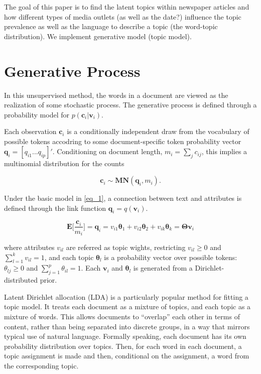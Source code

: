 \documentclass[12pt,a4paper,notitlepage]{article}
\begin{document}
The goal of this paper is to find the latent topics within newspaper articles and how different types of media outlets (as well as the date?) influence the topic prevalence as well as the language to describe a topic (the word-topic distribution). We implement generative model (topic model). 

\section{Generative Process}

In this unsupervised method, the words in a document are viewed as the realization of some stochastic process. The generative process is defined through a probability model for $p(\boldsymbol{c}_i|\boldsymbol{v}_i)$.

Each observation $\boldsymbol{c}_i$ is a conditionally independent draw from the vocabulary of possible tokens accodring to some document-specific token probability vector $\boldsymbol{q}_i=[q_{i1}...q_{ip}]'$. Conditioning on document length, $m_i=\sum_jc_{ij}$, this implies a multinomial distribution for the counts

\begin{equation}\label{eq_1}
	\boldsymbol{c}_i \sim \boldsymbol{MN}(\boldsymbol{q}_i,m_i). 
\end{equation}

Under the basic model in \ref{eq_1}, a connection between text and attributes is defined through the link function $\boldsymbol{q}_i=q(\boldsymbol{v}_i)$. 

\begin{equation}\label{eq_2}
	\boldsymbol{E} \bigg[\frac{\boldsymbol{c}_i}{m_i}\bigg]=\boldsymbol{q}_i =v_{i1}\boldsymbol{\theta}_1+v_{i2}\boldsymbol{\theta}_2+v_{ik}\boldsymbol{\theta}_k=\boldsymbol{\Theta v}_i
\end{equation}

where attributes $v_{il}$ are referred as topic wights, restricting $v_{il}\geq 0$ and $\sum^k_{l=1}v_{il}=1$, and each topic $\boldsymbol{\theta}_l$ is a probability vector over possible tokens: $\theta_{lj}\geq 0$ and $\sum^p_{j=1}\theta_{il}=1$. Each $\boldsymbol{v}_i$ and $\boldsymbol{\theta}_l$ is generated from a Dirichlet-distributed prior.

Latent Dirichlet allocation (LDA) is a particularly popular method for fitting a topic model. It treats each document as a mixture of topics, and each topic as a mixture of words. This allows documents to “overlap” each other in terms of content, rather than being separated into discrete groups, in a way that mirrors typical use of natural language. Formally speaking, each document has its own probability distribution over topics. Then, for each word in each document, a topic assignment is made and then, conditional on the assignment, a word from the corresponding topic. 
\end{document}
